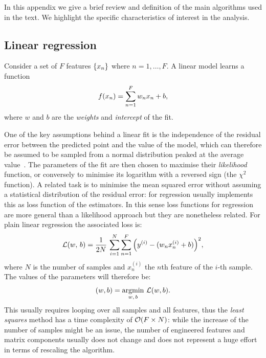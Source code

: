 In this appendix we give a brief review and definition of the main \ml algorithms used in the text.
We highlight the specific characteristics of interest in the analysis.

\subsection{Linear regression}
\label{sec:app:linreg}

Consider a set of $F$ features $\qty{ x_n }$ where $n = 1, \ldots, F$.
A linear model learns a function
\begin{equation}
  f(x_n) = \sum\limits_{n = 1}^{F} w_n x_n + b,
\end{equation}
where $w$ and $b$ are the \emph{weights} and \emph{intercept} of the fit.

One of the key assumptions behind a linear fit is the independence of the residual error between the predicted point and the value of the model, which can therefore be assumed to be sampled from a normal distribution peaked at the average value~\cite{Skiena:2017:DataScienceDesign, Caffo::DataScienceSpecialization}.
The parameters of the fit are then chosen to maximise their \emph{likelihood} function, or conversely to minimise its logarithm with a reversed sign (the $\chi^2$ function).
A related task is to minimise the mean squared error without assuming a statistical distribution of the residual error: \ml for regression usually implements this as loss function of the estimators.
In this sense loss functions for regression are more general than a likelihood approach but they are nonetheless related.
For plain linear regression the associated loss is:
\begin{equation}
  \mathcal{L}(w,\, b)
  =
  \frac{1}{2N}\,
  \sum\limits_{i = 1}^{N}
  \sum\limits_{n = 1}^{F}
  \qty( y^{(i)} - (w_n x_n^{(i)} + b) )^2,
\end{equation}
where $N$ is the number of samples and $x_n^{(i)}$ the $n$th feature of the $i$-th sample.
The values of the parameters will therefore be:
\begin{equation}
  \qty(w, b) = \underset{w,\, b}{\mathrm{argmin}}~ \mathcal{L}(w, b).
\end{equation}
This usually requires looping over all samples and all features, thus the \emph{least squares} method has a time complexity of $\order{ F \times N }$: while the increase of the number of samples might be an issue, the number of engineered features and matrix components usually does not change and does not represent a huge effort in terms of rescaling the algorithm.

